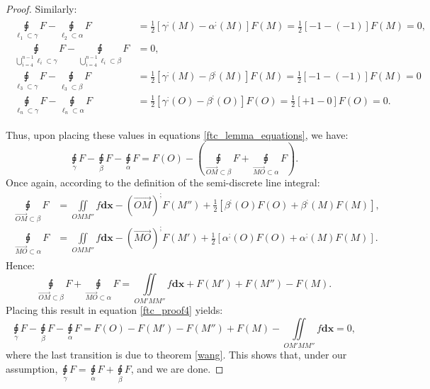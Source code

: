 \documentclass[11pt]{book}
\begin{document}
\begin{proof}
Similarly:
\begin{align}
\begin{aligned}
\underset{\ell_{1}\subset\gamma}{\sqint}F-\underset{\ell_{2}\subset\alpha}{\sqint}F & =\frac{1}{2}\left[\gamma^{;}\left(M\right)-\alpha^{;}\left(M\right)\right]F\left(M\right)=\frac{1}{2}\left[-1-\left(-1\right)\right]F\left(M\right)=0,\\
\underset{\bigcup_{i=4}^{n-1}\ell_{i}\subset\gamma}{\sqint}F-\underset{\bigcup_{i=4}^{n-1}\ell_{i}\subset\beta}{\sqint}F & =0,\\
\underset{\ell_{3}\subset\gamma}{\sqint}F-\underset{\ell_{3}\subset\beta}{\sqint}F & =\frac{1}{2}\left[\gamma^{;}\left(M\right)-\beta^{;}\left(M\right)\right]F\left(M\right)=\frac{1}{2}\left[-1-\left(-1\right)\right]F\left(M\right)=0\\
\underset{\ell_{n}\subset\gamma}{\sqint}F-\underset{\ell_{n}\subset\alpha}{\sqint}F & =\frac{1}{2}\left[\gamma^{;}\left(O\right)-\beta^{;}\left(O\right)\right]F\left(O\right)=\frac{1}{2}\left[+1-0\right]F\left(O\right)=0.
\end{aligned}
\end{align}

Thus, upon placing these values in equations \ref{ftc_lemma_equations}, we have:
\[
\underset{\gamma}{\sqint}F-\underset{\beta}{\sqint}F-\underset{\alpha}{\sqint}F=F\left(O\right)-\left(\underset{\overrightarrow{OM}\subset\beta}{\sqint}F+\underset{\overrightarrow{MO}\subset\alpha}{\sqint}F\right).\label{ftc_proof4}
\]
Once again, according to the definition of the semi-discrete line integral:
\begin{align}
\begin{aligned}
\underset{\overrightarrow{OM}\subset\beta}{\sqint}F & =\underset{OMM''}{\iint}f\boldsymbol{dx}-\left(\overrightarrow{OM}\right)^{;}F\left(M''\right)+\frac{1}{2}\left[\beta^{;}\left(O\right)F\left(O\right)+\beta^{;}\left(M\right)F\left(M\right)\right],\\
\underset{\overrightarrow{MO}\subset\alpha}{\sqint}F & =\underset{OMM''}{\iint}f\boldsymbol{dx}-\left(\overrightarrow{MO}\right)^{;}F\left(M'\right)+\frac{1}{2}\left[\alpha^{;}\left(O\right)F\left(O\right)+\alpha^{;}\left(M\right)F\left(M\right)\right].
\end{aligned}
\end{align}
Hence:
\[
\underset{\overrightarrow{OM}\subset\beta}{\sqint}F+\underset{\overrightarrow{MO}\subset\alpha}{\sqint}F=\underset{OM'MM''}{\iint}f\boldsymbol{dx}+F\left(M'\right)+F\left(M''\right)-F\left(M\right).
\]
Placing this result in equation \ref{ftc_proof4} yields:
\[
\underset{\gamma}{\sqint}F-\underset{\beta}{\sqint}F-\underset{\alpha}{\sqint}F=F\left(O\right)-F\left(M'\right)-F\left(M''\right)+F\left(M\right)-\underset{OM'MM''}{\iint}f\boldsymbol{dx}=0,
\]
where the last transition is due to theorem \ref{wang}.
This shows that, under our assumption, $\underset{\gamma}{\sqint}F=\underset{\alpha}{\sqint}F+\underset{\beta}{\sqint}F$,
and we are done.


\end{proof}
\end{document}
